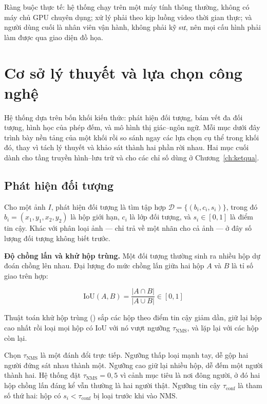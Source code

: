 Ràng buộc thực tế: hệ thống chạy trên một máy tính thông thường, không có máy
chủ GPU chuyên dụng; xử lý phải theo kịp luồng video thời gian thực; và người
dùng cuối là nhân viên vận hành, không phải kỹ sư, nên mọi cấu hình phải làm được
qua giao diện đồ họa.

\section{Cơ sở lý thuyết và lựa chọn công nghệ}
\label{sec:lythuyet}

Hệ thống dựa trên bốn khối kiến thức: phát hiện đối tượng, bám vết đa đối tượng,
hình học của phép đếm, và mô hình thị giác--ngôn ngữ. Mỗi mục dưới đây trình bày
nền tảng của một khối rồi so sánh ngay các lựa chọn cụ thể trong khối đó, thay vì
tách lý thuyết và khảo sát thành hai phần rời nhau. Hai mục cuối dành cho tầng
truyền hình--lưu trữ và cho các chỉ số dùng ở Chương~\ref{ch:ketqua}.

\subsection{Phát hiện đối tượng}
\label{sub:phathien-lythuyet}

Cho một ảnh $I$, phát hiện đối tượng là tìm tập hợp
$\mathcal{D} = \{(b_i, c_i, s_i)\}$, trong đó $b_i = (x_1, y_1, x_2, y_2)$ là hộp giới
hạn, $c_i$ là lớp đối tượng, và $s_i \in [0,1]$ là điểm tin cậy. Khác với phân loại
ảnh --- chỉ trả về một nhãn cho cả ảnh --- ở đây số lượng đối tượng không biết trước.


\textbf{Độ chồng lấn và khử hộp trùng.} Một đối tượng thường sinh ra nhiều hộp dự đoán
chồng lên nhau. Đại lượng đo mức chồng lấn giữa hai hộp $A$ và $B$ là tỉ số giao trên
hợp:

\begin{equation}
  \mathrm{IoU}(A, B) = \frac{|A \cap B|}{|A \cup B|} \in [0, 1]
  \label{eq:iou}
\end{equation}

Thuật toán khử hộp trùng () sắp các hộp theo điểm tin cậy
giảm dần, giữ lại hộp cao nhất rồi loại mọi hộp có $\mathrm{IoU}$ với nó vượt ngưỡng
$\tau_{\text{NMS}}$, và lặp lại với các hộp còn lại.

Chọn $\tau_{\text{NMS}}$ là một đánh đổi trực tiếp. Ngưỡng thấp loại mạnh tay, dễ gộp
hai người đứng sát nhau thành một. Ngưỡng cao giữ lại nhiều hộp, dễ đếm một người thành
hai. Hệ thống đặt $\tau_{\text{NMS}} = 0{,}5$ vì cảnh mục tiêu là nơi đông người, ở đó
hai hộp chồng lấn đáng kể vẫn thường là hai người thật. Ngưỡng tin cậy
$\tau_{\text{conf}}$ là tham số thứ hai: hộp có $s_i < \tau_{\text{conf}}$ bị loại
trước khi vào NMS.

